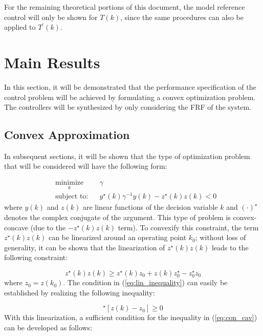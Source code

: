 \documentclass[a4paper, 10pt, conference]{ieeeconf}
\begin{document}
For the remaining theoretical portions of this document, the model reference control will only be shown for $T(k)$, since the same procedures can also be applied to $T^{\prime}(k)$. 

\section{Main Results}
\label{sec:main}
In this section, it will be demonstrated that the performance specification of the control problem will be achieved by formulating a convex optimization problem. The controllers will be synthesized by only considering the FRF of the system.

\subsection{Convex Approximation}
In subsequent sections, it will be shown that the type of optimization problem that will be considered will have the following form:

\begin{equation} \label{eq:con_cav}
\begin{aligned}
& \underset{ k }{\text{minimize}}
& & \gamma  \\
& \text{subject to:} & & y^{\star}(k) \gamma^{-1} y(k) - z^{\star}(k)z(k) < 0 
\end{aligned}
\end{equation}
where $y(k)$ and $z(k)$ are linear functions of the decision variable $k$ and $(\cdot)^{\star}$ denotes the complex conjugate of the argument. This type of problem is convex-concave (due to the $-z^{\star}(k)z(k)$ term). To convexify this constraint, the term $z^{\star}(k)z(k)$ can be linearized around an operating point $k_0$; without loss of generality, it can be shown that the linearization of $z^{\star}(k)z(k)$ leads to the following constraint:

\begin{equation} \label{eq:lin_inequality}
z^{\star}(k)z(k) \geq z^{\star}(k)z_0 + z(k)z_0^{\star} - z_0^{\star}z_0
\end{equation} 
where $z_0 = z(k_0)$. The condition in (\ref{eq:lin_inequality}) can easily be established by realizing the following inequality:

\begin{equation}
[z(k)-z_0]^{\star}[z(k)-z_0] \geq 0
\end{equation}
With this linearization, a sufficient condition for the inequality in (\ref{eq:con_cav}) can be developed as follows:
\end{document}
